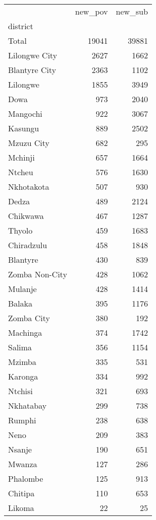 \begin{tabular}{lrr}
\toprule
{} &  new\_pov &  new\_sub \\
district       &          &          \\
\midrule
Total          &    19041 &    39881 \\
Lilongwe City  &     2627 &     1662 \\
Blantyre City  &     2363 &     1102 \\
Lilongwe       &     1855 &     3949 \\
Dowa           &      973 &     2040 \\
Mangochi       &      922 &     3067 \\
Kasungu        &      889 &     2502 \\
Mzuzu City     &      682 &      295 \\
Mchinji        &      657 &     1664 \\
Ntcheu         &      576 &     1630 \\
Nkhotakota     &      507 &      930 \\
Dedza          &      489 &     2124 \\
Chikwawa       &      467 &     1287 \\
Thyolo         &      459 &     1683 \\
Chiradzulu     &      458 &     1848 \\
Blantyre       &      430 &      839 \\
Zomba Non-City &      428 &     1062 \\
Mulanje        &      428 &     1414 \\
Balaka         &      395 &     1176 \\
Zomba City     &      380 &      192 \\
Machinga       &      374 &     1742 \\
Salima         &      356 &     1154 \\
Mzimba         &      335 &      531 \\
Karonga        &      334 &      992 \\
Ntchisi        &      321 &      693 \\
Nkhatabay      &      299 &      738 \\
Rumphi         &      238 &      638 \\
Neno           &      209 &      383 \\
Nsanje         &      190 &      651 \\
Mwanza         &      127 &      286 \\
Phalombe       &      125 &      913 \\
Chitipa        &      110 &      653 \\
Likoma         &       22 &       25 \\
\bottomrule
\end{tabular}
